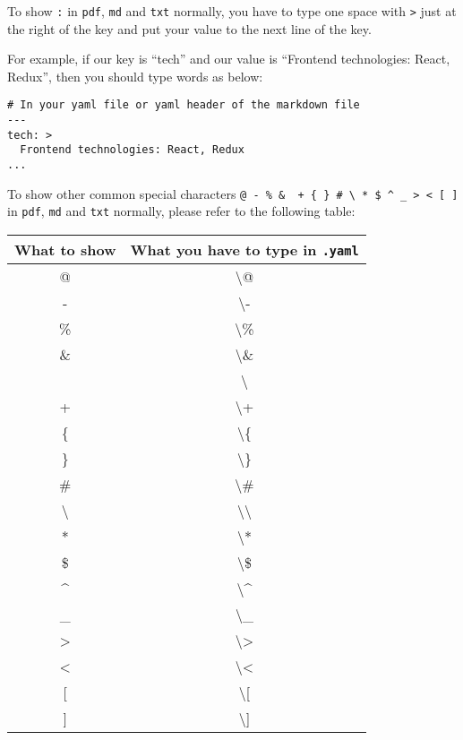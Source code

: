 \documentclass[10pt, a4paper, oneside]{article}
\begin{document}
To show \texttt{:} in \texttt{pdf}, \texttt{md} and \texttt{txt} normally,
you have to type one space with \texttt{\textgreater{}} just at the right of the key and
put your value to the next line of the key.

For example, if our key is ``tech'' and our value is ``Frontend technologies: React, Redux'',
then you should type words as below:

\begin{verbatim}
# In your yaml file or yaml header of the markdown file
---
tech: >
  Frontend technologies: React, Redux
...
\end{verbatim}

To show other common special characters \texttt{@\ -\ \%\ \&\ \textbar{}\ +\ \{\ \}\ \#\ \textbackslash{}\ *\ \$\ \^{}\ \_\ \textgreater{}\ \textless{}\ {[}\ {]}}
in \texttt{pdf}, \texttt{md} and \texttt{txt} normally, please refer to the following table:

\begin{longtable}[c]{@{}cc@{}}
\toprule
What to show & What you have to type in \texttt{.yaml}\tabularnewline
\midrule
\endhead
@ & \textbackslash{}@\tabularnewline
- & \textbackslash{}-\tabularnewline
\% & \textbackslash{}\%\tabularnewline
\& & \textbackslash{}\&\tabularnewline
\textbar{} & \textbackslash{}\textbar{}\tabularnewline
+ & \textbackslash{}+\tabularnewline
\{ & \textbackslash{}\{\tabularnewline
\} & \textbackslash{}\}\tabularnewline
\# & \textbackslash{}\#\tabularnewline
\textbackslash{} & \textbackslash{}\textbackslash{}\tabularnewline
* & \textbackslash{}*\tabularnewline
\$ & \textbackslash{}\$\tabularnewline
\^{} & \textbackslash{}\^{}\tabularnewline
\_ & \textbackslash{}\_\tabularnewline
\textgreater{} & \textbackslash{}\textgreater{}\tabularnewline
\textless{} & \textbackslash{}\textless{}\tabularnewline
{[} & \textbackslash{}{[}\tabularnewline
{]} & \textbackslash{}{]}\tabularnewline
\bottomrule
\end{longtable}


\printindex
\end{document}
